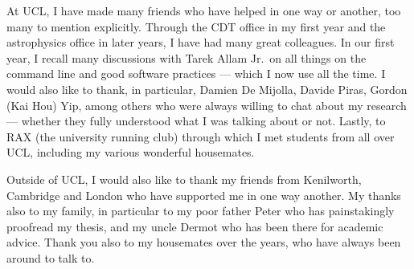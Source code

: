 \begin{acknowledgements}
	At UCL, I have made many friends who have helped in one way or another, too many to mention explicitly.
	Through the CDT office in my first year and the astrophysics office in later years, I have had many great colleagues.
	In our first year, I recall many discussions with Tarek Allam Jr.\ on all things on the command line and good software practices --- which I now use all the time.
	I would also like to thank, in particular, Damien De Mijolla, Davide Piras, Gordon (Kai Hou) Yip, among others who were always willing to chat about my research --- whether they fully understood what I was talking about or not.
	Lastly, to RAX (the university running club) through which I met students from all over UCL, including my various wonderful housemates.

	Outside of UCL, I would also like to thank my friends from Kenilworth, Cambridge and London who have supported me in one way another.
	My thanks also to my family, in particular to my poor father Peter who has painstakingly proofread my thesis, and my uncle Dermot who has been there for academic advice.
	Thank you also to my housemates over the years, who have always been around to talk to.
\end{acknowledgements}

\setcounter{tocdepth}{2}

\tableofcontents
\listoffigures
\listoftables
